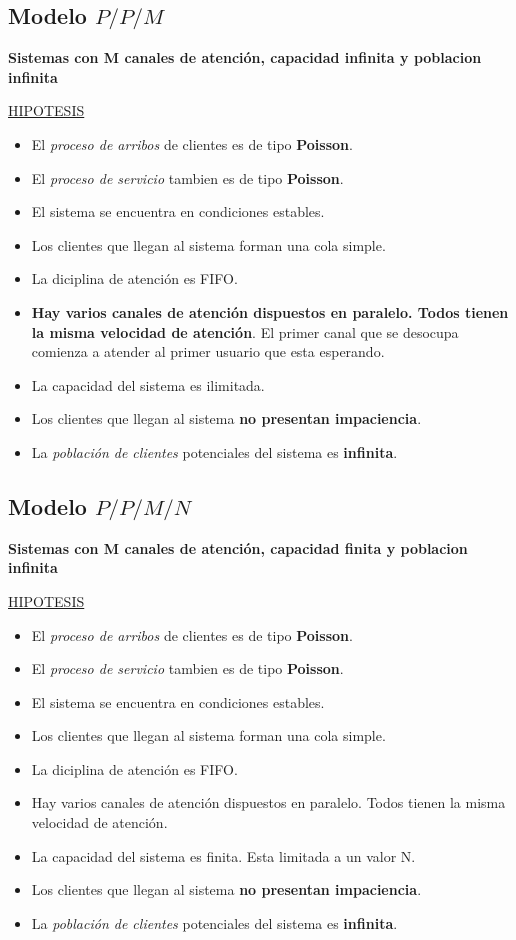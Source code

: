 \documentclass{article}
\begin{document}
\subsection{Modelo \(P/P/M\)}

\textbf{Sistemas con M canales de atención, capacidad infinita y poblacion infinita}

\noindent
\underline{HIPOTESIS}
\begin{itemize}
    \item El \textit{proceso de arribos} de clientes es de tipo \textbf{Poisson}.
    \item El \textit{proceso de servicio} tambien es de tipo \textbf{Poisson}.
    \item El sistema se encuentra en condiciones estables.
    \item Los clientes que llegan al sistema forman una cola simple.
    \item La diciplina de atención es FIFO.
    \item \textbf{Hay varios canales de atención dispuestos en paralelo. Todos tienen la misma velocidad de atención}. El primer canal que se desocupa comienza a atender al primer usuario que esta esperando.
    \item La capacidad del sistema es ilimitada.
    \item Los clientes que llegan al sistema \textbf{no presentan impaciencia}.
    \item La \textit{población de clientes} potenciales del sistema es \textbf{infinita}.
\end{itemize}

\subsection{Modelo \(P/P/M/N\)}

\textbf{Sistemas con M canales de atención, capacidad finita y poblacion infinita}

\noindent
\underline{HIPOTESIS}
\begin{itemize}
    \item El \textit{proceso de arribos} de clientes es de tipo \textbf{Poisson}.
    \item El \textit{proceso de servicio} tambien es de tipo \textbf{Poisson}.
    \item El sistema se encuentra en condiciones estables.
    \item Los clientes que llegan al sistema forman una cola simple.
    \item La diciplina de atención es FIFO.
    \item Hay varios canales de atención dispuestos en paralelo. Todos tienen la misma velocidad de atención.
    \item La capacidad del sistema es finita. Esta limitada a un valor N.
    \item Los clientes que llegan al sistema \textbf{no presentan impaciencia}.
    \item La \textit{población de clientes} potenciales del sistema es \textbf{infinita}.
\end{itemize}
\end{document}
